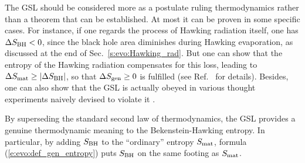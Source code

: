 The GSL should be considered more as a postulate ruling
thermodynamics rather than a theorem that can be established. At most it
can be proven in some specific cases.
For instance, if one regards the process of Hawking radiation itself, one
has $\Delta S_{\rm BH} < 0$, since the black hole area diminishes
during Hawking evaporation, as discussed at the end of
Sec.~\ref{s:evo:Hawking_rad}. But one can show that the entropy of the Hawking radiation
compensates for this loss, leading to $\Delta S_{\rm mat} \geq |\Delta S_{\rm BH}|$,
so that $ \Delta S_{\rm gen} \geq 0$ is fulfilled (see Ref.~\cite{Wald01} for details).
Besides, one can also show that the GSL is actually obeyed in various thought experiments
naively devised to violate it \cite{Carli14,Wald94,Wald01,Wall09}.

By superseding the standard second law of thermodynamics, the GSL provides a
genuine thermodynamic meaning to the Bekenstein-Hawking entropy.
In particular, by adding $S_{\rm BH}$ to the ``ordinary'' entropy $S_{\rm mat}$, formula (\ref{e:evo:def_gen_entropy})
puts $S_{\rm BH}$ on the same footing as $S_{\rm mat}$.

